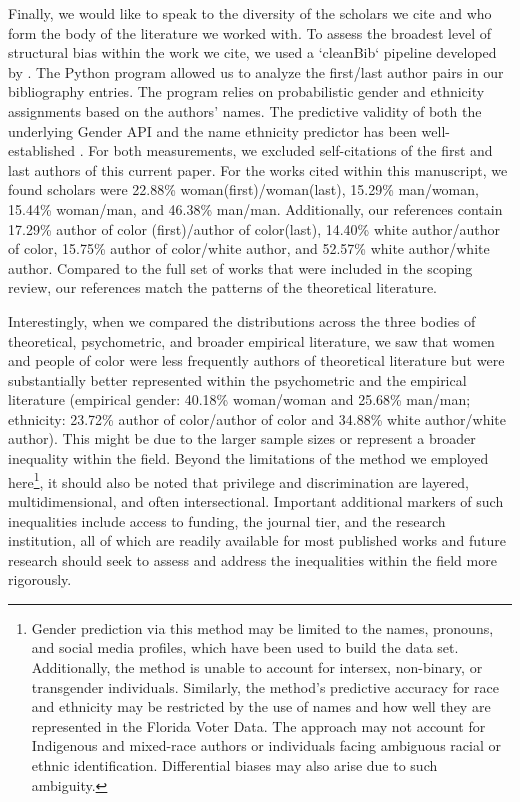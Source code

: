 \documentclass[man, 12pt, a4paper, mask]{apa7}
\begin{document}
Finally, we would like to speak to the diversity of the scholars we cite and who form the body of the literature we worked with. To assess the broadest level of structural bias within the work we cite, we used a `cleanBib` pipeline developed by \citet{zhou2022}. The Python program allowed us to analyze the first/last author pairs in our bibliography entries. The program relies on probabilistic gender and ethnicity assignments based on the authors' names. The predictive validity of both the underlying Gender API \citep[][]{sebo2021} and the name ethnicity predictor has been well-established \citep[][]{ambekar2009, sood2018}. For both measurements, we excluded self-citations of the first and last authors of this current paper. For the works cited within this manuscript, we found scholars were 22.88\% woman(first)/woman(last), 15.29\% man/woman, 15.44\% woman/man, and 46.38\% man/man. Additionally, our references contain 17.29\% author of color (first)/author of color(last), 14.40\% white author/author of color, 15.75\% author of color/white author, and 52.57\% white author/white author. Compared to the full set of works that were included in the scoping review, our references match the patterns of the theoretical literature. 

Interestingly, when we compared the distributions across the three bodies of theoretical, psychometric, and broader empirical literature, we saw that women and people of color were less frequently authors of theoretical literature but were substantially better represented within the psychometric and the empirical literature (empirical gender: 40.18\% woman/woman and 25.68\% man/man; ethnicity: 23.72\% author of color/author of color and 34.88\% white author/white author). This might be due to the larger sample sizes or represent a broader inequality within the field. Beyond the limitations of the method we employed here\footnote{Gender prediction via this method may be limited to the names, pronouns, and social media profiles, which have been used to build the data set. Additionally, the method is unable to account for intersex, non-binary, or transgender individuals. Similarly, the method's predictive accuracy for race and ethnicity may be restricted by the use of names and how well they are represented in the Florida Voter Data. The approach may not account for Indigenous and mixed-race authors or individuals facing ambiguous racial or ethnic identification. Differential biases may also arise due to such ambiguity.}, it should also be noted that privilege and discrimination are layered, multidimensional, and often intersectional. Important additional markers of such inequalities include access to funding, the journal tier, and the research institution, all of which are readily available for most published works and future research should seek to assess and address the inequalities within the field more rigorously. 
\end{document}
